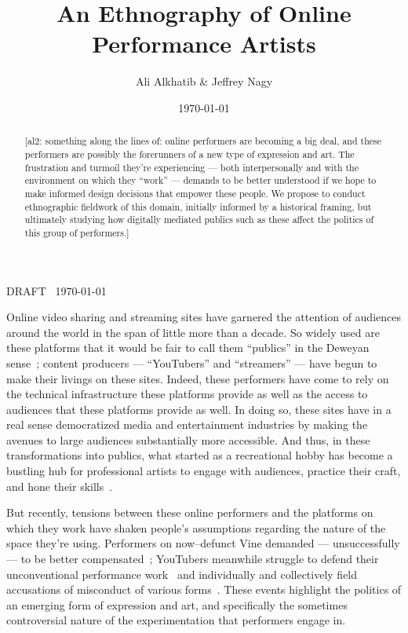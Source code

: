 \documentclass[10pt]{article}
\title{An Ethnography of Online Performance Artists}
\author{Ali Alkhatib \& Jeffrey Nagy}
\date{\today}
\makeatletter
\def\maketitle{%
\par{\centering {\scshape \LARGE \textbf{\@title}}%
\par{\@author}
\par{DRAFT \DTMcurrenttime~\today}%
\par}}
\newcommand{\ali}[1]{{\color{Red}[al2: #1]}}
\newcommand{\topic}[1]{{\color{Blue}#1}}
\renewcommand{\topic}[1]{{#1}}
\makeatother
\begin{document}
  \maketitle
  \begin{abstract}
  \ali{something along the lines of: online performers are becoming a big deal, and
       these performers are possibly the forerunners of a new type of expression and art.
       The frustration and turmoil they're experiencing
       --- both interpersonally and with the environment on which they ``work'' ---
       demands to be better understood if we hope to make informed design decisions that empower these people.
       We propose to conduct ethnographic fieldwork of this domain,
       initially informed by a historical framing, but
       ultimately studying how digitally mediated publics such as these affect
       the politics of this group of performers.}
  \end{abstract}



\topic{Online video sharing %
and streaming sites %
have garnered the attention of audiences around the world
in the span of little more than a decade.} %
So widely used are these platforms
that it would be fair to call them ``publics'' in the Deweyan sense~\cite{dewey2012public,disalvo2009design};
content producers
--- ``YouTubers'' and ``streamers'' ---
have begun to make their livings on these sites.
Indeed, these performers have come to rely on
the technical infrastructure these platforms provide as well as
the access to audiences that these platforms provide as well.
In doing so, these sites have in a real sense democratized media and entertainment industries by
making the avenues to large audiences substantially more accessible.
And thus, in these transformations into publics, what started as
a recreational hobby
has become a bustling hub for professional artists to
engage with audiences,
practice their craft, and 
hone their skills~\cite{Hamilton:2014:STF:2611105.2557048,Zhang:2015:CIL:2736084.2736091}.

\topic{But recently, tensions between these online performers and the platforms on which they work have shaken people's
assumptions regarding the nature of the space they're using.}
Performers on now--defunct Vine demanded --- unsuccessfully --- to be better compensated~\cite{vineWantsMoney,vineInsiderMeeting};
YouTubers meanwhile struggle to defend their unconventional performance work~\cite{h3h3Lawsuit}
and individually and collectively field accusations of misconduct of various forms~\cite{youtubeDramaResponses}.
These events highlight the politics of an emerging form of expression and art,
and specifically the sometimes controversial nature of the experimentation that performers engage in.
\end{document}
